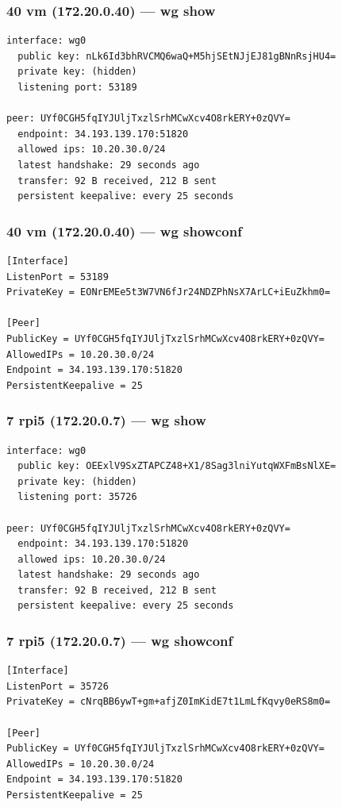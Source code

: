 \documentclass[11pt,a4paper]{article}
\begin{document}
\subsubsection*{40 vm (172.20.0.40) — wg show}
\begin{lstlisting}
interface: wg0
  public key: nLk6Id3bhRVCMQ6waQ+M5hjSEtNJjEJ81gBNnRsjHU4=
  private key: (hidden)
  listening port: 53189

peer: UYf0CGH5fqIYJUljTxzlSrhMCwXcv4O8rkERY+0zQVY=
  endpoint: 34.193.139.170:51820
  allowed ips: 10.20.30.0/24
  latest handshake: 29 seconds ago
  transfer: 92 B received, 212 B sent
  persistent keepalive: every 25 seconds

\end{lstlisting}

\subsubsection*{40 vm (172.20.0.40) — wg showconf}
\begin{lstlisting}
[Interface]
ListenPort = 53189
PrivateKey = EONrEMEe5t3W7VN6fJr24NDZPhNsX7ArLC+iEuZkhm0=

[Peer]
PublicKey = UYf0CGH5fqIYJUljTxzlSrhMCwXcv4O8rkERY+0zQVY=
AllowedIPs = 10.20.30.0/24
Endpoint = 34.193.139.170:51820
PersistentKeepalive = 25

\end{lstlisting}

\subsubsection*{7 rpi5 (172.20.0.7) — wg show}
\begin{lstlisting}
interface: wg0
  public key: OEExlV9SxZTAPCZ48+X1/8Sag3lniYutqWXFmBsNlXE=
  private key: (hidden)
  listening port: 35726

peer: UYf0CGH5fqIYJUljTxzlSrhMCwXcv4O8rkERY+0zQVY=
  endpoint: 34.193.139.170:51820
  allowed ips: 10.20.30.0/24
  latest handshake: 29 seconds ago
  transfer: 92 B received, 212 B sent
  persistent keepalive: every 25 seconds

\end{lstlisting}

\subsubsection*{7 rpi5 (172.20.0.7) — wg showconf}
\begin{lstlisting}
[Interface]
ListenPort = 35726
PrivateKey = cNrqBB6ywT+gm+afjZ0ImKidE7t1LmLfKqvy0eRS8m0=

[Peer]
PublicKey = UYf0CGH5fqIYJUljTxzlSrhMCwXcv4O8rkERY+0zQVY=
AllowedIPs = 10.20.30.0/24
Endpoint = 34.193.139.170:51820
PersistentKeepalive = 25

\end{lstlisting}
\end{document}
